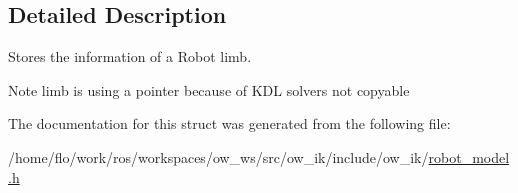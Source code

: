 \subsection{Detailed Description}
Stores the information of a Robot limb. 

\begin{DoxyNote}{Note}
limb is using a pointer because of K\+DL solvers not copyable 
\end{DoxyNote}


The documentation for this struct was generated from the following file\+:\begin{DoxyCompactItemize}
\item 
/home/flo/work/ros/workspaces/ow\+\_\+ws/src/ow\+\_\+ik/include/ow\+\_\+ik/\hyperlink{robot__model_8h}{robot\+\_\+model.\+h}\end{DoxyCompactItemize}
